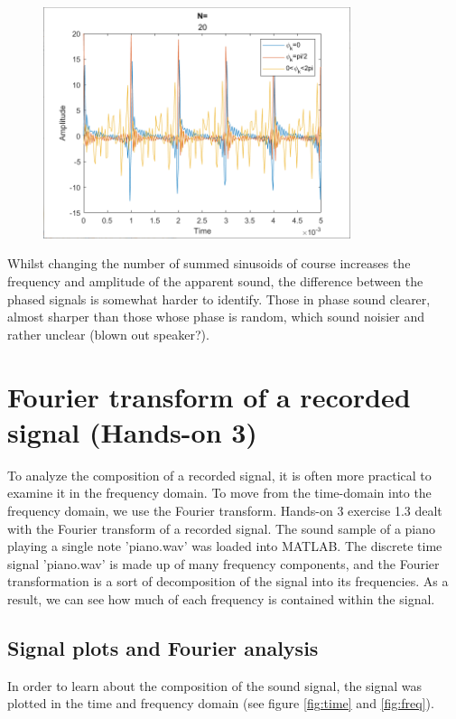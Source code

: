 \documentclass[journal]{IEEEtran}
\begin{document}
\begin{figure}[H]
    \centering
    \includegraphics[width=9cm]{assignment_01/plots/N=20.png}
    \label{fig:N=20}
\end{figure}

Whilst changing the number of summed sinusoids of course increases the frequency and amplitude of the apparent sound, the difference between the phased signals is somewhat harder to identify. Those in phase sound clearer, almost sharper than those whose phase is random, which sound noisier and rather unclear (blown out speaker?).

\section{Fourier transform of a recorded signal (Hands-on 3)}
To analyze the composition of a recorded signal, it is often more practical to examine it in the frequency domain. To move from the time-domain into the frequency domain, we use the Fourier transform. 
Hands-on 3 exercise 1.3 dealt with the Fourier transform of a recorded signal. The sound sample of a piano playing a single note 'piano.wav' was loaded into MATLAB. The discrete time signal 'piano.wav' is made up of many frequency components, and the Fourier transformation is a sort of decomposition of the signal into its frequencies. As a result, we can see how much of each frequency is contained within the signal.

\subsection{Signal plots and Fourier analysis}
In order to learn about the composition of the sound signal, the signal was plotted in the time and frequency domain (see figure \ref{fig:time} and \ref{fig:freq}). 
\end{document}
